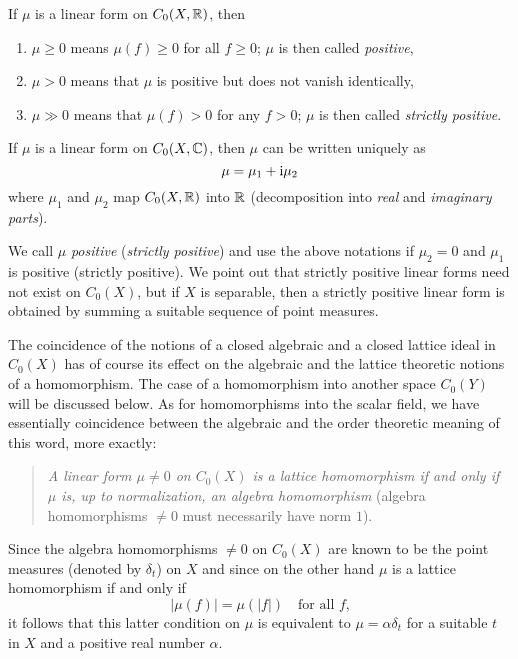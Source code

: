 If $\mu$ is a linear form on $C_{0}(X,\mathbb{R})$, then
\begin{enumerate}[\upshape (i), labelindent=.5em]

\item
$\mu \geq 0$ means  $ \mu(f) \geq 0 $ for all $ f \geq 0 $;  $ \mu $ is then called \emph{positive},

\item
$ \mu > 0 $ means that $ \mu $ is positive but does not vanish identically,

\item
$ \mu \gg 0 $ means that $ \mu(f) > 0 $ for any $ f > 0 $;  $ \mu $ is then called \emph{strictly positive}.

\end{enumerate}
If $\mu$ is a linear form on $C_{0}(X,\mathbb{C})$, then $\mu$ can be written uniquely as 
%
\[
	\mu = \mu_{1} + \mathrm{i} \mu_{2}
\]
%
where $\mu_{1}$ and $\mu_{2}$ map $C_{0}(X,\mathbb{R})$ into $\mathbb{R}$ (decomposition into \emph{real} and \emph{imaginary parts}).

We call $\mu$ \emph{positive} (\emph{strictly positive}) and use the above notations if $\mu_{2} = 0$ and $\mu_{1}$ is positive (strictly positive).
We point out that strictly positive linear forms need not exist on $C_{0}(X)$, but if $X$ is separable, then a strictly positive linear form is obtained by summing a suitable sequence of point measures.

The coincidence of the notions of a closed algebraic and a closed lattice ideal in $C_{0}(X)$ has of course its effect on the algebraic and the lattice theoretic notions of a homomorphism.
The case of a homomorphism into another space $C_{0}(Y)$ will be discussed below.
As for homomorphisms into the scalar field, we have essentially coincidence between the algebraic and the order theoretic meaning of this word, more exactly: 
\begin{quote}
\emph{A linear form $\mu \neq 0$ on $C_{0}(X)$ is a lattice homomorphism if and only if $\mu$ is, up to normalization, an algebra homomorphism }(algebra homomorphisms $\neq 0$ must necessarily have norm $1$).
\end{quote}
Since the algebra homomorphisms $\neq 0$ on $C_{0}(X)$ are known to be the point measures (denoted by $\delta_{t}$) on $X$ and since on the other hand $\mu$ is a lattice homomorphism if and only if 
%
\[
	|\mu(f)| =  \mu(|f|) \quad \text{for all $f$,}
\]
%
it follows that this latter condition on $\mu$ is equivalent to $\mu = \alpha\delta_{t}$ for a suitable $t$ in $X$ and a positive real number $\alpha$.

